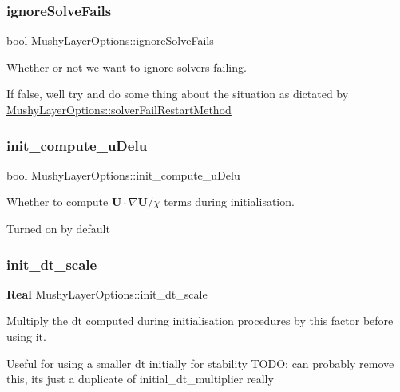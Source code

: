 \subsubsection{\texorpdfstring{ignore\+Solve\+Fails}{ignoreSolveFails}}
{\footnotesize\ttfamily bool Mushy\+Layer\+Options\+::ignore\+Solve\+Fails}



Whether or not we want to ignore solvers failing. 

If false, we\textquotesingle{}ll try and do some thing about the situation as dictated by \hyperlink{struct_mushy_layer_options_abf11a35aae07875e68c218024cf8bc73}{Mushy\+Layer\+Options\+::solver\+Fail\+Restart\+Method} \mbox{\label{struct_mushy_layer_options_a4b9d47e17442336a6ae899dd7bb7ef07}} 
\subsubsection{\texorpdfstring{init\+\_\+compute\+\_\+u\+Delu}{init\_compute\_uDelu}}
{\footnotesize\ttfamily bool Mushy\+Layer\+Options\+::init\+\_\+compute\+\_\+u\+Delu}



Whether to compute $ \mathbf{U} \cdot \nabla \mathbf{U}/\chi $ terms during initialisation. 

Turned on by default \mbox{\label{struct_mushy_layer_options_a4aaa6aa92a57d3df414d311ded23b0a6}} 
\subsubsection{\texorpdfstring{init\+\_\+dt\+\_\+scale}{init\_dt\_scale}}
{\footnotesize\ttfamily \textbf{ Real} Mushy\+Layer\+Options\+::init\+\_\+dt\+\_\+scale}



Multiply the dt computed during initialisation procedures by this factor before using it. 

Useful for using a smaller dt initially for stability T\+O\+DO\+: can probably remove this, it\textquotesingle{}s just a duplicate of initial\+\_\+dt\+\_\+multiplier really \mbox{\label{struct_mushy_layer_options_a647f70bde2bffc9ef777504a9127d298}} 
